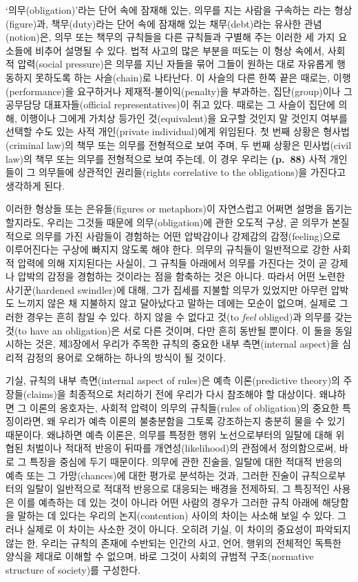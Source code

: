 ‘의무(obligation)’라는 단어 속에 잠재해 있는, 의무를 지는 사람을
구속하는 라는 형상(figure)과, 책무(duty)라는 단어 속에
잠재해 있는 채무(debt)라는 유사한 관념(notion)은, 의무 또는 책무의
규칙들을 다른 규칙들과 구별해 주는 이러한 세 가지 요소들에 비추어 설명될
수 있다. 법적 사고의 많은 부분을 떠도는 이 형상 속에서, 사회적
압력(social pressure)은 의무를 지닌 자들을 묶어 그들이 원하는 대로
자유롭게 행동하지 못하도록 하는 사슬(chain)로 나타난다. 이 사슬의 다른
한쪽 끝은 때로는, 이행(performance)을 요구하거나
제재적-불이익(penalty)을 부과하는, 집단(group)이나 그 공무담당
대표자들(official representatives)이 쥐고 있다. 때로는 그 사슬이 집단에
의해, 이행이나 그에게 가치상 등가인 것(equivalent)을 요구할 것인지 말
것인지 여부를 선택할 수도 있는 사적 개인(private individual)에게
위임된다. 첫 번째 상황은 형사법(criminal law)의 책무 또는 의무를
전형적으로 보여 주며, 두 번째 상황은 민사법(civil law)의 책무 또는
의무를 전형적으로 보여 주는데, 이 경우 우리는 \textbf{(p.~88)} 사적
개인들이 그 의무들에 상관적인 권리들(rights correlative to the
obligations)을 가진다고 생각하게 된다.

이러한 형상들 또는 은유들(figures or metaphors)이 자연스럽고 어쩌면
설명을 돕기는 할지라도, 우리는 그것들 때문에 의무(obligation)에 관한
오도적 구상, 곧 의무가 본질적으로 의무를 가진 사람들이 경험하는 어떤
압박감이나 강제감의 감정(feeling)으로 이루어진다는 구상에 빠지지 않도록
해야 한다. 의무의 규칙들이 일반적으로 강한 사회적 압력에 의해 지지된다는
사실이, 그 규칙들 아래에서 의무를 가진다는 것이 곧 강제나 압박의 감정을
경험하는 것이라는 점을 함축하는 것은 아니다. 따라서 어떤 노련한
사기꾼(hardened swindler)에 대해, 그가 집세를 지불할 의무가 있었지만
아무런 압박도 느끼지 않은 채 지불하지 않고 달아났다고 말하는 데에는
모순이 없으며, 실제로 그러한 경우는 흔히 참일 수 있다. 하지 않을 수
없다고  것(to \emph{feel} obliged)과 의무를 갖는 것(to have
an obligation)은 서로 다른 것이며, 다만 흔히 동반될 뿐이다. 이 둘을
동일시하는 것은, 제3장에서 우리가 주목한 규칙의 중요한 내부
측면(internal aspect)을 심리적 감정의 용어로 오해하는 하나의 방식이 될
것이다.

기실, 규칙의 내부 측면(internal aspect of rules)은 예측 이론(predictive
theory)의 주장들(claims)을 최종적으로 처리하기 전에 우리가 다시 참조해야
할 대상이다. 왜냐하면 그 이론의 옹호자는, 사회적 압력이 의무의
규칙들(rules of obligation)의 중요한 특징이라면, 왜 우리가 예측 이론의
불충분함을 그토록 강조하는지 충분히 물을 수 있기 때문이다. 왜냐하면 예측
이론은, 의무를 특정한 행위 노선으로부터의 일탈에 대해 위협된 처벌이나
적대적 반응이 뒤따를 개연성(likelihood)의 관점에서 정의함으로써, 바로 그
특징을 중심에 두기 때문이다. 의무에 관한 진술을, 일탈에 대한 적대적
반응의 예측 또는 그 가망(chances)에 대한 평가로 분석하는 것과, 그러한
진술이 규칙으로부터의 일탈이 일반적으로 적대적 반응으로 대응되는 배경을
전제하되, 그 특징적인 사용은 이를 예측하는 데 있는 것이 아니라 어떤
사람의 경우가 그러한 규칙 아래에 해당함을 말하는 데 있다는 우리의
논지(contention) 사이의 차이는 사소해 보일 수 있다. 그러나 실제로 이
차이는 사소한 것이 아니다. 오히려 기실, 이 차이의 중요성이 파악되지 않는
한, 우리는 규칙의 존재에 수반되는 인간의 사고, 언어, 행위의 전체적인
독특한 양식을 제대로 이해할 수 없으며, 바로 그것이 사회의 규범적
구조(normative structure of society)를 구성한다.

